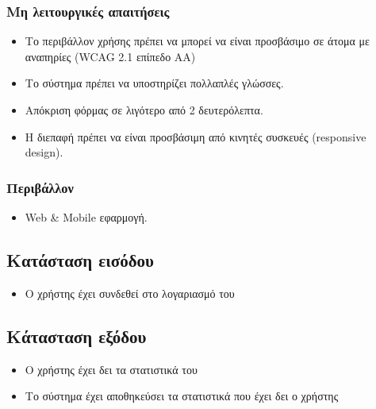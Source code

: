 \documentclass[12pt,a4paper,twoside]{book}
\begin{document}
\subsubsection{Μη λειτουργικές απαιτήσεις}
\begin{itemize}
  \item Το περιβάλλον χρήσης πρέπει να μπορεί να  είναι προσβάσιμο σε  άτομα με αναπηρίες (WCAG 2.1 επίπεδο AA) %
  \item Το σύστημα πρέπει να υποστηρίζει πολλαπλές γλώσσες.
  \item Απόκριση φόρμας σε λιγότερο από 2 δευτερόλεπτα. %
  \item Η διεπαφή πρέπει να είναι προσβάσιμη από κινητές συσκευές (responsive design). %
\end{itemize}

\subsubsection{Περιβάλλον}
\begin{itemize}
  \item Web \& Mobile εφαρμογή.
\end{itemize}

\subsection{Κατάσταση εισόδου} %
\begin{itemize}
  \item Ο χρήστης έχει συνδεθεί στο λογαριασμό του %
\end{itemize}

\subsection{Κάτασταση εξόδου} %
\begin{itemize}
  \item Ο χρήστης έχει δει τα στατιστικά του %
  \item Το σύστημα έχει αποθηκεύσει τα στατιστικά που έχει δει ο χρήστης %
\end{itemize}
\end{document}
